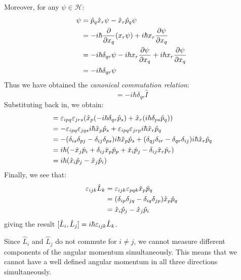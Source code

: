 \documentclass[../main.tex]{subfiles}
\begin{document}
\begin{enumerate}
    Moreover, for any $\psi \in \mathcal{H}$:
    \begin{align*}
      [\hat{p}_q, \hat{x}_r]\psi &= \hat{p}_q \hat{x}_r \psi - \hat{x}_r \hat{p}_q \psi \\
                                 &= -i\hbar\pderiv{}{x_q}(x_r \psi) + i\hbar x_r \pderiv{\psi}{x_q} \\
                                 &= -i\hbar\delta_{q r} \psi - i\hbar x_r \pderiv{\psi}{x_q} + i\hbar x_r \pderiv{\psi}{x_q} \\
                                 &= -i\hbar \delta_{q r} \psi
    \end{align*}
    Thus we have obtained the \textit{canonical commutation relation}:
    \begin{equation}
      [\hat{p}_q, \hat{x}_r] = -i\hbar\delta_{q r}\hat{I} \label{CCR}
    \end{equation}
    Substituting back in, we obtain:
    \begin{align*}
      [\hat{L}_i, \hat{L}_j] &= \levi_{i p q} \levi_{j r s} (\hat{x}_p (-i\hbar \delta_{q r}\hat{p}_s) + \hat{x}_r(i\hbar\delta_{p s}\hat{p}_q)) \\
                             &= -\levi_{i p q} \levi_{j q s} i\hbar \hat{x}_p \hat{p}_s + \levi_{i p q}\levi_{j r p} i\hbar \hat{x}_r \hat{p}_q \\
                             &= -(\delta_{i s}\delta_{p j} - \delta_{i j}\delta_{p s})i\hbar \hat{x}_p \hat{p}_s + (\delta_{q j}\delta_{i r} - \delta_{q r}\delta_{i j})i\hbar \hat{x}_r \hat{p}_q \\
                             &= i\hbar(-\hat{x}_j\hat{p}_i + \delta_{i j}\hat{x}_p\hat{p}_p + \hat{x}_i\hat{p}_j - \delta_{i j}\hat{x}_r\hat{p}_r) \\
                             &= i\hbar(\hat{x}_i\hat{p}_j - \hat{x}_j\hat{p}_i)
    \end{align*}
    Finally, we see that:
    \begin{align*}
      \varepsilon_{i j k} \hat{L}_k &= \varepsilon_{i j k}\varepsilon_{p q k} \hat{x}_p \hat{p}_q \\
                              &= (\delta_{i p}\delta_{j q} - \delta_{i q}\delta_{j p})\hat{x}_p \hat{p}_q \\
                              &= \hat{x}_i \hat{p}_j - \hat{x}_j \hat{p}_i
    \end{align*}
    giving the result $[\hat{L}_i, \hat{L}_j] = i\hbar\varepsilon_{i j k}\hat{L}_k$.

    Since $\hat{L}_i$ and $\hat{L}_j$ do not commute for $i \neq j$, we cannot measure different components of the angular momentum simultaneously.
    This means that we cannot have a well defined angular momentum in all three directions simultaneously.
\end{enumerate}
\end{document}
